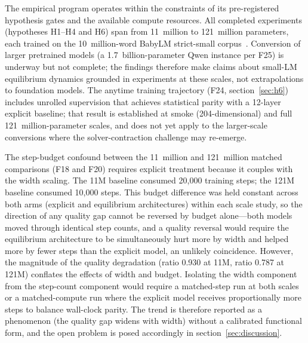 
The empirical program operates within the constraints of its pre-registered hypothesis gates and the available compute resources. All completed experiments (hypotheses H1–H4 and H6) span from 11~million to 121~million parameters, each trained on the 10~million-word BabyLM strict-small corpus~\cite{Warstadt2023}. Conversion of larger pretrained models (a 1.7~billion-parameter Qwen instance per F25) is underway but not complete; the findings therefore make claims about small-LM equilibrium dynamics grounded in experiments at these scales, not extrapolations to foundation models. The anytime training trajectory (F24, section~\ref{sec:h6}) includes unrolled supervision that achieves statistical parity with a 12-layer explicit baseline; that result is established at smoke (204-dimensional) and full 121~million-parameter scales, and does not yet apply to the larger-scale conversions where the solver-contraction challenge may re-emerge.

The step-budget confound between the 11~million and 121~million matched comparisons (F18 and F20) requires explicit treatment because it couples with the width scaling. The 11M baseline consumed 20,000 training steps; the 121M baseline consumed 10,000 steps. This budget difference was held constant across both arms (explicit and equilibrium architectures) within each scale study, so the direction of any quality gap cannot be reversed by budget alone—both models moved through identical step counts, and a quality reversal would require the equilibrium architecture to be simultaneously hurt more by width and helped more by fewer steps than the explicit model, an unlikely coincidence. However, the magnitude of the quality degradation (ratio 0.930 at 11M, ratio 0.787 at 121M) conflates the effects of width and budget. Isolating the width component from the step-count component would require a matched-step run at both scales or a matched-compute run where the explicit model receives proportionally more steps to balance wall-clock parity. The trend is therefore reported as a phenomenon (the quality gap widens with width) without a calibrated functional form, and the open problem is posed accordingly in section~\ref{sec:discussion}.


